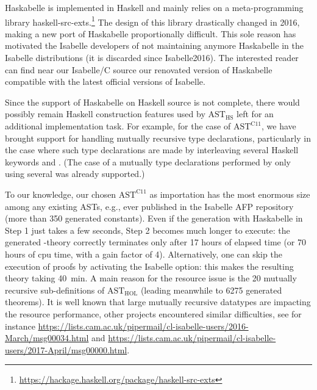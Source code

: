\begin{isabellebody}
\begin{isamarkuptext}
Haskabelle is implemented in Haskell and mainly relies on a meta-programming library
haskell-src-exts.\footnote{\url{https://hackage.haskell.org/package/haskell-src-exts}} The
design of this library drastically changed in 2016, making a new port of Haskabelle proportionally
difficult. This sole reason has motivated the Isabelle developers of not maintaining anymore
Haskabelle in the Isabelle distributions (it is discarded since Isabelle2016). The interested reader
can find near our Isabelle/C source our renovated version of Haskabelle compatible with the latest
official versions of Isabelle.%
\end{isamarkuptext}\isamarkuptrue%
%
\isadelimdocument
%
\endisadelimdocument
%
\isatagdocument
%
\isamarkuptrue%
%
\endisatagdocument
{\isafolddocument}%
%
\isadelimdocument
%
\endisadelimdocument
%
\begin{isamarkuptext}%
Since the support of Haskabelle on Haskell source is not complete, there would possibly
remain Haskell construction features used by $\text{AST}_{\text{HS}}$ left for an additional
implementation task. For example, for the case of $\text{AST}^{\text{C11}}$, we have brought support
for handling mutually recursive type declarations, particularly in the case where such type
declarations are made by interleaving several Haskell keywords  and
. (The case of a mutually type declarations performed by only using
several  was already supported.)%
\end{isamarkuptext}\isamarkuptrue%
%
\isadelimdocument
%
\endisadelimdocument
%
\isatagdocument
%
\isamarkuptrue%
%
\endisatagdocument
{\isafolddocument}%
%
\isadelimdocument
%
\endisadelimdocument
%
\begin{isamarkuptext}%
To our knowledge, our chosen $\text{AST}^{\text{C11}}$ as importation has the most
enormous size among any existing ASTs, e.g., ever published in the Isabelle AFP repository (more
than 350 generated constants). Even if the generation with Haskabelle in Step 1 just takes a few
seconds, Step 2 becomes much longer to execute: the generated
-theory correctly terminates only after 17 hours of elapsed
time (or 70 hours of cpu time, with a gain factor of 4). Alternatively, one can skip the execution
of proofs by activating the Isabelle  option: this makes the resulting
theory taking 40~min. A main reason for the resource issue is the 20 mutually recursive
sub-definitions of $\text{AST}_{\text{HOL}}$ (leading meanwhile to 6275 generated theorems). It is
well known that large mutually recursive datatypes are impacting the resource performance, other
projects encountered similar difficulties, see for instance
\url{https://lists.cam.ac.uk/pipermail/cl-isabelle-users/2016-March/msg00034.html}
and
\url{https://lists.cam.ac.uk/pipermail/cl-isabelle-users/2017-April/msg00000.html}.


\end{isamarkuptext}
\end{isabellebody}
